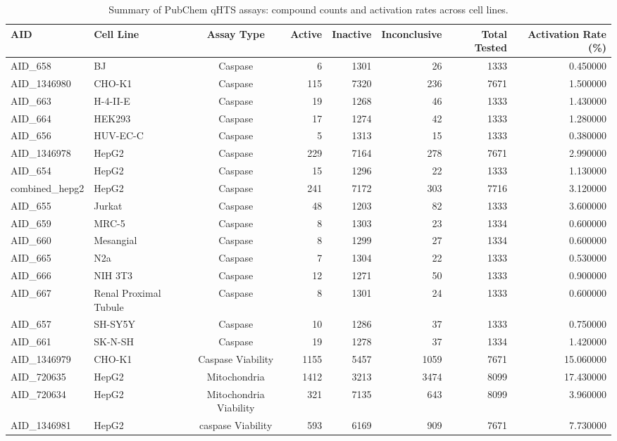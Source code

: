 \begin{table}
\caption{Summary of PubChem qHTS assays: compound counts and activation rates across cell lines.}
\label{tab:assay_summary}
\begin{tabular}{llcrrrrr}
\toprule
AID & Cell Line & Assay Type & Active & Inactive & Inconclusive & Total Tested & Activation Rate (\%) \\
\midrule
AID\_658 & BJ & Caspase & 6 & 1301 & 26 & 1333 & 0.450000 \\
AID\_1346980 & CHO-K1 & Caspase & 115 & 7320 & 236 & 7671 & 1.500000 \\
AID\_663 & H-4-II-E & Caspase & 19 & 1268 & 46 & 1333 & 1.430000 \\
AID\_664 & HEK293 & Caspase & 17 & 1274 & 42 & 1333 & 1.280000 \\
AID\_656 & HUV-EC-C & Caspase & 5 & 1313 & 15 & 1333 & 0.380000 \\
AID\_1346978 & HepG2 & Caspase & 229 & 7164 & 278 & 7671 & 2.990000 \\
AID\_654 & HepG2 & Caspase & 15 & 1296 & 22 & 1333 & 1.130000 \\
combined\_hepg2 & HepG2 & Caspase & 241 & 7172 & 303 & 7716 & 3.120000 \\
AID\_655 & Jurkat & Caspase & 48 & 1203 & 82 & 1333 & 3.600000 \\
AID\_659 & MRC-5 & Caspase & 8 & 1303 & 23 & 1334 & 0.600000 \\
AID\_660 & Mesangial & Caspase & 8 & 1299 & 27 & 1334 & 0.600000 \\
AID\_665 & N2a & Caspase & 7 & 1304 & 22 & 1333 & 0.530000 \\
AID\_666 & NIH 3T3 & Caspase & 12 & 1271 & 50 & 1333 & 0.900000 \\
AID\_667 & Renal Proximal Tubule & Caspase & 8 & 1301 & 24 & 1333 & 0.600000 \\
AID\_657 & SH-SY5Y & Caspase & 10 & 1286 & 37 & 1333 & 0.750000 \\
AID\_661 & SK-N-SH & Caspase & 19 & 1278 & 37 & 1334 & 1.420000 \\
AID\_1346979 & CHO-K1 & Caspase Viability & 1155 & 5457 & 1059 & 7671 & 15.060000 \\
AID\_720635 & HepG2 & Mitochondria & 1412 & 3213 & 3474 & 8099 & 17.430000 \\
AID\_720634 & HepG2 & Mitochondria Viability & 321 & 7135 & 643 & 8099 & 3.960000 \\
AID\_1346981 & HepG2 & caspase Viability & 593 & 6169 & 909 & 7671 & 7.730000 \\
\bottomrule
\end{tabular}
\end{table}
